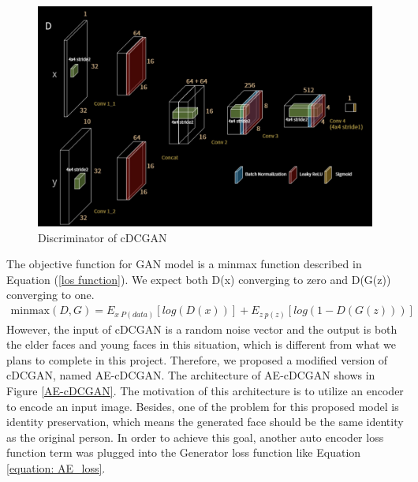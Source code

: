 \documentclass{article}
\begin{document}
\begin{figure}[H]
\begin{center}
  \centering
  \includegraphics[width=5in]{image/cdcgan_d.png}
\end{center}
\caption{Discriminator of cDCGAN}
\label{cdcgan_d}
\end{figure}
The objective function for GAN model is a minmax function described in Equation (\ref{los function}). We expect both D(x) converging to zero and D(G(z)) converging to one.
\begin{equation}
\begin{split}
\text{minmax}(D,G)=E_{x~P(data)}[log(D(x))]+E_{z~p(z)}[log(1-D(G(z)))]
\end{split}
\label{los function}
\end{equation}
However, the input of cDCGAN is a random noise vector and the output is both the elder faces and young faces in this situation, which is different from what we plans to complete in this project. Therefore, we proposed a modified version of cDCGAN, named AE-cDCGAN. The architecture of AE-cDCGAN shows in Figure \ref{AE-cDCGAN}. The motivation of this architecture is to utilize an encoder to encode an input image. Besides, one of the problem for this proposed model is identity preservation, which means the generated face should be the same identity as the original person. In order to achieve this goal, another auto encoder loss function term was plugged into the Generator loss function like Equation \ref{equation: AE_loss}.
\end{document}

